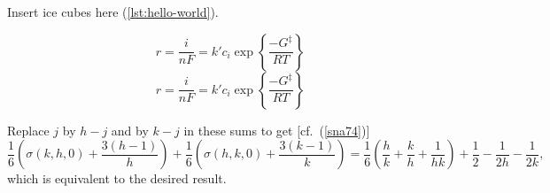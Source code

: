 
Insert ice cubes here (\ref{lst:hello-world}).



\ifbreqn

	\begin{equation*}
	r = \frac{i}{n F} = k' c_i \exp\left\{ \frac{-G^{\ddagger}}{R T} \right\}
	\end{equation*}
	\begin{equation*}
	r = \frac{i}{n F} = k' c_i \exp\left\{ \frac{-G^{\ddagger}}{R T} \right\}
	\end{equation*}

	Replace $j$ by $h-j$ and by $k-j$ in these sums to get [cf.~(\ref{sna74})]
	\begin{equation*}
	\label{sna74}
	\frac{1}{6} \left(\sigma(k,h,0) +\frac{3(h-1)}{h}\right)
	+\frac{1}{6} \left(\sigma(h,k,0) +\frac{3(k-1)}{k}\right)
	=\frac{1}{6} \left(\frac{h}{k} +\frac{k}{h} +\frac{1}{hk}\right)
	+\frac{1}{2} -\frac{1}{2h} -\frac{1}{2k},
	\end{equation*}
	which is equivalent to the desired result.
\fi





